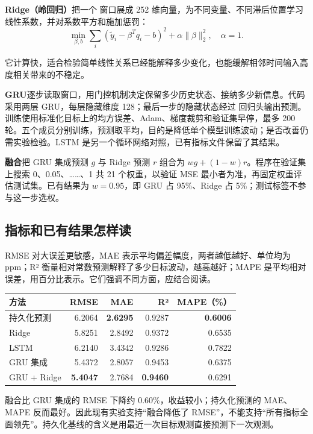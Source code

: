 \documentclass[UTF8,fontset=windows,11pt,a4paper]{ctexart}
\begin{document}
\textbf{Ridge（岭回归）}把一个  窗口展成 252 维向量，为不同变量、不同滞后位置学习线性系数，并对系数平方和施加惩罚：
\[
\min_{\beta,b}\sum_i(\widetilde y_i-\beta^Tq_i-b)^2+\alpha\|\beta\|_2^2,
\quad\alpha=1.
\]

它计算快，适合检验简单线性关系已经能解释多少变化，也能缓解相邻时间输入高度相关带来的不稳定。

\textbf{GRU}逐步读取窗口，用门控机制决定保留多少历史状态、接纳多少新信息。代码采用两层 GRU，每层隐藏维度 128；最后一步的隐藏状态经过  回归头输出预测。训练使用标准化目标上的均方误差、Adam、梯度裁剪和验证集早停，最多 200 轮。五个成员分别训练，预测取平均，目的是降低单个模型训练波动；是否改善仍需实验检验。LSTM 是另一个循环网络对照，已有指标文件保留了其结果。

\textbf{融合}把 GRU 集成预测 \(g\) 与 Ridge 预测 \(r\) 组合为 \(wg+(1-w)r\)。程序在验证集上搜索 0、0.05、……、1 共 21 个权重，以验证 MSE 最小者为准，再固定权重评估测试集。已有结果为 \(w=0.95\)，即 GRU 占 95\%、Ridge 占 5\%；测试标签不参与这一步选权。

\subsection{指标和已有结果怎样读}

RMSE 对大误差更敏感，MAE 表示平均偏差幅度，两者越低越好、单位均为 ppm；R² 衡量相对常数预测解释了多少目标波动，越高越好；MAPE 是平均相对误差，用百分比表示。它们强调不同方面，应结合阅读。

\begin{center}\small\begin{tabularx}{\linewidth}{Xrrrr}\toprule
方法 & RMSE & MAE & R² & MAPE（\%） \\
\midrule
持久化预测 & 6.2064 & \textbf{2.6295} & 0.9287 & \textbf{0.6006} \\
Ridge & 5.8251 & 2.8492 & 0.9372 & 0.6535 \\
LSTM & 6.2140 & 3.4342 & 0.9286 & 0.7822 \\
GRU 集成 & 5.4372 & 2.8057 & 0.9453 & 0.6375 \\
GRU + Ridge & \textbf{5.4047} & 2.7684 & \textbf{0.9460} & 0.6291 \\
\bottomrule\end{tabularx}\end{center}

融合比 GRU 集成的 RMSE 下降约 0.60\%，收益较小；持久化预测的 MAE、MAPE 反而最好。因此现有实验支持“融合降低了 RMSE”，不能支持“所有指标全面领先”。持久化基线的含义是用最近一次目标观测直接预测下一次观测。
\end{document}
